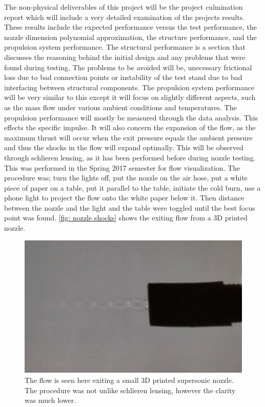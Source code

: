 \documentclass[conference]{IEEEtran} %
\begin{document}
The non-physical deliverables of this project will be the project culmination report which will include a very detailed examination of the projects
results. These results include the expected performance versus the test performance, the nozzle dimension polynomial approximation, the structure performance, and the
propulsion system performance. The structural performance is a section that discusses the reasoning behind the initial design and any problems
that were found during testing. The problems to be avoided will be, unecessary frictional loss due to bad connection points or instability of the test stand due to
bad interfacing between structural components. The propulsion system performance will be very similar to this except it will focus on slightly different aspects, such as
the mass flow under various ambient conditions and temperatures. The propulsion performance will mostly be measured through the data analysis. This effects the
specific impulse. It will also concern the expansion of the flow, as the maximum thrust will occur when the exit pressure equals the ambient pressure and thus the shocks
in the flow will expand optimally. This will be observed through schlieren lensing, as it has been performed before during nozzle testing. This was performed in the Spring 2017
semester for flow visualization. The procedure was; turn the lights off, put the nozzle on the air hose, put a white piece of paper on a table, put it parallel to the table, initiate the cold burn, use a phone light
to project the flow onto the white paper below it. Then distance between the nozzle and the light and the table were toggled until the best focus point was found. \autoref{fig: nozzle shocks}
shows the exiting flow from a 3D printed nozzle.

\begin{figure}[h]
  \includegraphics[width=\linewidth]{figs/nozzle-shocks[2].png}
  \caption{The flow is seen here exiting a small 3D printed supersonic nozzle. The procedure was not unlike schlieren lensing, however the clarity was much lower.}
  \label{fig: nozzle-shocks}
\end{figure}
\end{document}
